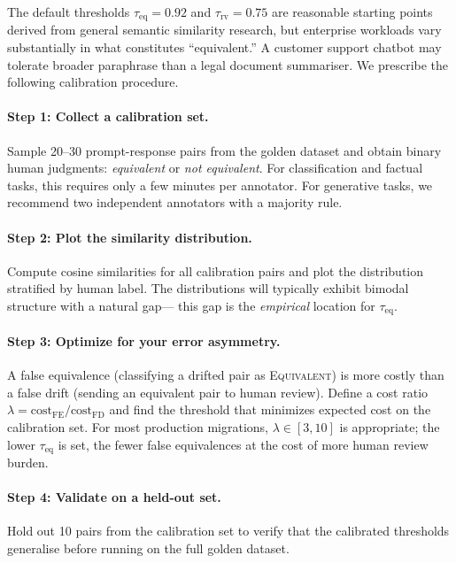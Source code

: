 \documentclass[11pt,a4paper]{article}
\begin{document}
The default thresholds $\tau_\text{eq} = 0.92$ and $\tau_\text{rv} = 0.75$ are
reasonable starting points derived from general semantic similarity research, but
enterprise workloads vary substantially in what constitutes ``equivalent.''
A customer support chatbot may tolerate broader paraphrase than a legal document
summariser.
We prescribe the following calibration procedure.

\paragraph{Step 1: Collect a calibration set.}
Sample 20--30 prompt-response pairs from the golden dataset and obtain binary
human judgments: \emph{equivalent} or \emph{not equivalent}.
For classification and factual tasks, this requires only a few minutes per annotator.
For generative tasks, we recommend two independent annotators with a majority rule.

\paragraph{Step 2: Plot the similarity distribution.}
Compute cosine similarities for all calibration pairs and plot the distribution
stratified by human label.
The distributions will typically exhibit bimodal structure with a natural gap---
this gap is the \emph{empirical} location for $\tau_\text{eq}$.

\paragraph{Step 3: Optimize for your error asymmetry.}
A false equivalence (classifying a drifted pair as \textsc{Equivalent}) is
more costly than a false drift (sending an equivalent pair to human review).
Define a cost ratio $\lambda = \text{cost}_\text{FE} / \text{cost}_\text{FD}$
and find the threshold that minimizes expected cost on the calibration set.
For most production migrations, $\lambda \in [3, 10]$ is appropriate; the lower
$\tau_\text{eq}$ is set, the fewer false equivalences at the cost of more human
review burden.

\paragraph{Step 4: Validate on a held-out set.}
Hold out 10 pairs from the calibration set to verify that the calibrated thresholds
generalise before running on the full golden dataset.
\end{document}
